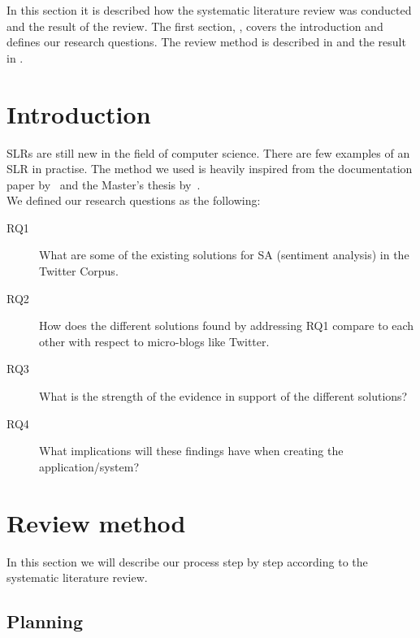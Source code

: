 In this section it is described how the systematic literature review was conducted and the result of the review. The first section, , covers the introduction and defines our research questions. The review method is described in  and the result in .


\section{Introduction}
\label{sec:slrintro}

SLRs are still new in the field of computer science. There are few examples of an SLR in practise. The method we used is heavily inspired from the documentation paper by~\cite{paper:slrdesc} and the Master's thesis by~\cite{master:slr}. \\

\noindent We defined our research questions as the following:

\begin{description}

\item[RQ1] What are some of the existing solutions for SA (sentiment analysis) in the Twitter Corpus.
\item[RQ2] How does the different solutions found by addressing RQ1 compare to each other with respect to micro-blogs like Twitter.
\item[RQ3] What is the strength of the evidence in support of the different solutions?
\item[RQ4] What implications will these findings have when creating the application/system?

\end{description}

\section{Review method}
\label{sec:slrmethod}

In this section we will describe our process step by step according to the systematic literature review. 

\subsection{Planning}

